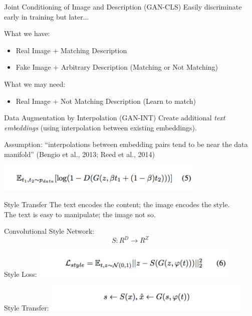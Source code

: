 \documentclass{beamer}
\begin{document}
\begin{frame}{Joint Conditioning of Image and Description (GAN-CLS)}
Easily discriminate early in training but later...
\vskip 0.5cm

What we have:
\begin{itemize}
\item Real Image + Matching Description
\item Fake Image + Arbitrary Description (Matching or Not Matching)
\end{itemize}
\vskip 0.5cm

What we may need:
\begin{itemize}
\item Real Image + Not Matching Description (Learn to match)
\end{itemize}
\end{frame}


\begin{frame}{Data Augmentation by Interpolation (GAN-INT)}
Create additional \textit{text embeddings} (using interpolation between existing embeddings).
\vskip 0.5cm

Assumption: ``interpolations between embedding pairs tend to be near the data manifold'' (Bengio et al., 2013; Reed et al., 2014)
\vskip 0.5cm

\centering
\includegraphics[width=10cm]{img/reed/interpolation.png}

\end{frame}


\begin{frame}{Style Transfer}
The text encodes the content; the image encodes the style. \\
The text is easy to manipulate; the image not so.
\vskip 0.5cm

\begin{block}{Convolutional Style Network:}
$$S: R^D \rightarrow R^Z$$
\end{block}
\vskip 0.5cm

\begin{block}{Style Loss:}
\centering
\includegraphics[width=10cm]{img/reed/style_loss.png}
\end{block}
\vskip 0.5cm

\begin{block}{Style Transfer:}
\centering
\includegraphics[width=10cm]{img/reed/style_transfer.png}
\end{block}

\end{frame}
\end{document}
